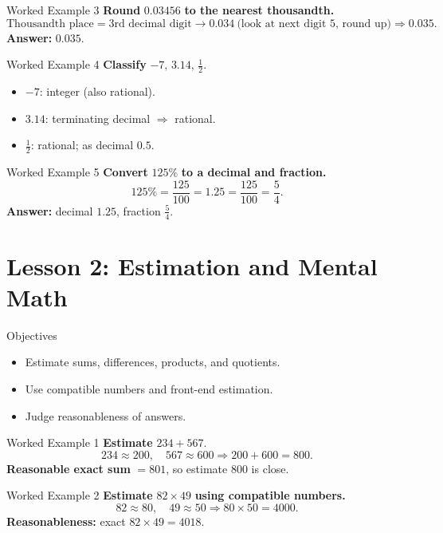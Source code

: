 \documentclass[aspectratio=169]{beamer}
\begin{document}
\begin{frame}{Worked Example 3}
\textbf{Round } \(0.03456\) \textbf{ to the nearest thousandth.}
\[
\text{Thousandth place} = 3\text{rd decimal digit} \to 0.034\ \text{(look at next digit 5, round up)} \Rightarrow 0.035.
\]
\textbf{Answer: } \(0.035\).
\end{frame}

\begin{frame}{Worked Example 4}
\textbf{Classify } \(-7,\, 3.14,\, \frac{1}{2}\).
\begin{itemize}
  \item \(-7\): integer (also rational).
  \item \(3.14\): terminating decimal \(\Rightarrow\) rational.
  \item \(\frac{1}{2}\): rational; as decimal \(0.5\).
\end{itemize}
\end{frame}

\begin{frame}{Worked Example 5}
\textbf{Convert } \(125\%\) \textbf{ to a decimal and fraction.}
\[
125\% = \frac{125}{100} = 1.25 = \frac{125}{100} = \frac{5}{4}.
\]
\textbf{Answer: } decimal \(1.25\), fraction \(\frac{5}{4}\).
\end{frame}

\section{Lesson 2: Estimation and Mental Math}

\begin{frame}{Objectives}
\begin{itemize}
  \item Estimate sums, differences, products, and quotients.
  \item Use compatible numbers and front-end estimation.
  \item Judge reasonableness of answers.
\end{itemize}
\end{frame}

\begin{frame}{Worked Example 1}
\textbf{Estimate } \(234 + 567\).
\[
234 \approx 200,\quad 567 \approx 600 \Rightarrow 200 + 600 = 800.
\]
\textbf{Reasonable exact sum } \(= 801\), so estimate \(800\) is close.
\end{frame}

\begin{frame}{Worked Example 2}
\textbf{Estimate } \(82 \times 49\) \textbf{ using compatible numbers.}
\[
82 \approx 80,\quad 49 \approx 50 \Rightarrow 80 \times 50 = 4000.
\]
\textbf{Reasonableness: } exact \(82\times49=4018\).
\end{frame}
\end{document}
